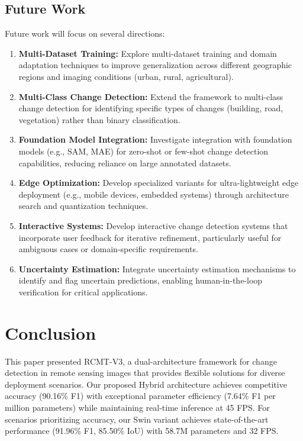 \documentclass[journal]{IEEEtran}
\begin{document}
{\subsection{Future Work}

Future work will focus on several directions:

\begin{enumerate}
\item \textbf{Multi-Dataset Training:} Explore multi-dataset training and domain adaptation techniques to improve generalization across different geographic regions and imaging conditions (urban, rural, agricultural).

\item \textbf{Multi-Class Change Detection:} Extend the framework to multi-class change detection for identifying specific types of changes (building, road, vegetation) rather than binary classification.

\item \textbf{Foundation Model Integration:} Investigate integration with foundation models (e.g., SAM, MAE) for zero-shot or few-shot change detection capabilities, reducing reliance on large annotated datasets.

\item \textbf{Edge Optimization:} Develop specialized variants for ultra-lightweight edge deployment (e.g., mobile devices, embedded systems) through architecture search and quantization techniques.

\item \textbf{Interactive Systems:} Develop interactive change detection systems that incorporate user feedback for iterative refinement, particularly useful for ambiguous cases or domain-specific requirements.

\item \textbf{Uncertainty Estimation:} Integrate uncertainty estimation mechanisms to identify and flag uncertain predictions, enabling human-in-the-loop verification for critical applications.

\end{enumerate}

\section{Conclusion}

This paper presented RCMT-V3, a dual-architecture framework for change detection in remote sensing images that provides flexible solutions for diverse deployment scenarios. Our proposed Hybrid architecture achieves competitive accuracy (90.16\% F1) with exceptional parameter efficiency (7.64\% F1 per million parameters) while maintaining real-time inference at 45 FPS. For scenarios prioritizing accuracy, our Swin variant achieves state-of-the-art performance (91.96\% F1, 85.50\% IoU) with 58.7M parameters and 32 FPS.

}
\end{document}
